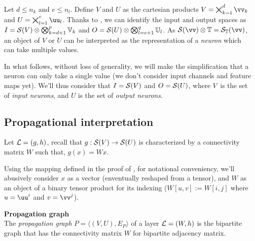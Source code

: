 Let $d \le n_k$ and $e \le n_l$. Define $V$ and $U$ as the cartesian products $V = \bigtimes_{k=1}^d \vv_k$ and $U = \bigtimes_{l=1}^e \uu_l$. Thanks to , we can identify the input and output spaces as $I = \mathcal{S}(V) \otimes \bigotimes_{k=d+1}^p \mathbb{V}_k$ and $O = \mathcal{S}(U) \otimes \bigotimes_{l=e+1}^q \mathbb{U}_l$. As $\cs(\vv) \otimes \bbt = \cs_{\bbt}(\vv)$, an object of $V$ or $U$ can be interpreted as the representation of a \emph{neuron} which can take multiple values.

\vspace{10pt}
In what follows, without loss of generality, we will make the simplification that a neuron can only take a single value (we don't consider input channels and feature maps yet). We'll thus consider that $I = \mathcal{S}(V)$ and $O = \mathcal{S}(U)$, where $V$~is the set of \emph{input neurons}, and $U$ is the set of \emph{output neurons}.

\subsection{Propagational interpretation}

Let $\mathcal{L} = (g,h)$, recall that $g: \mathcal{S}(V) \rightarrow \mathcal{S}(U)$ is characterized by a connectivity matrix $W$ such that, $g(x) = Wx$.

\begin{remark}Using the mapping defined in the proof of , for notational conveniency, we'll abusively consider $x$ as a vector (enventually reshaped from a tensor), and $W$ as an object of a binary tensor product for its indexing (\ie $W[u,v] := W[i,j]$ where $u = \uu^i$ and $v = \vv^j$).
\end{remark}


\begin{definition}\textbf{Propagation graph}\\
The \emph{propagation graph} $P = \langle (V, U), E_P \rangle$ of a layer $\mathcal{L} = (W,h)$ is the bipartite graph that has the connectivity matrix $W$ for bipartite adjacency matrix.
\end{definition}

